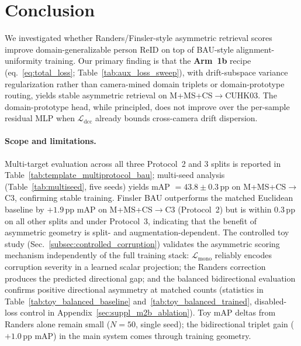 \section{Conclusion} \label{sec:conclusion}
We investigated whether Randers/Finsler-style asymmetric retrieval scores improve domain-generalizable person ReID on top of BAU-style alignment-uniformity training. Our primary finding is that the \textbf{Arm~1b} recipe (eq.~\ref{eq:total_loss}; Table~\ref{tab:aux_loss_sweep}), with drift-subspace variance regularization rather than camera-mined domain triplets or domain-prototype routing, yields stable asymmetric retrieval on M+MS+CS$\rightarrow$CUHK03.  The domain-prototype head, while principled, does not improve over the per-sample residual MLP when $\mathcal{L}_{\mathrm{dcc}}$ already bounds cross-camera drift dispersion. 

\paragraph{Scope and limitations.}
Multi-target evaluation across all three Protocol~2 and 3 splits is reported in Table~\ref{tab:template_multiprotocol_bau}; multi-seed analysis (Table~\ref{tab:multiseed}, five seeds) yields mAP $= 43.8 \pm 0.3\,\mathrm{pp}$ on M+MS+CS$\rightarrow$C3, confirming stable training. Finsler BAU outperforms the matched Euclidean baseline by $+1.9\,\mathrm{pp}$ mAP on M+MS+CS$\rightarrow$C3 (Protocol~2) but is within $0.3\,\mathrm{pp}$ on all other splits and under Protocol~3, indicating that the benefit of asymmetric geometry is split- and augmentation-dependent. The controlled toy study (Sec.~\ref{subsec:controlled_corruption}) validates the asymmetric scoring mechanism independently of the full training stack: $\mathcal{L}_{\mathrm{mono}}$ reliably encodes corruption severity in a learned scalar projection; the Randers correction produces the predicted directional gap; and the balanced bidirectional evaluation confirms positive directional asymmetry at matched counts (statistics in Table~\ref{tab:toy_balanced_baseline} and~\ref{tab:toy_balanced_trained}, disabled-loss control in Appendix~\ref{sec:suppl_m2b_ablation}). Toy mAP deltas from Randers alone remain small ($N\!=\!50$, single seed); the bidirectional triplet gain ($+1.0\,\mathrm{pp}$ mAP) in the main system comes through training geometry.


